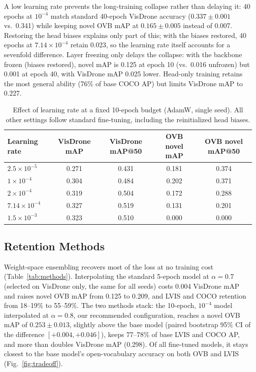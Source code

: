 \documentclass[conf]{new-aiaa}
\begin{document}
A low learning rate prevents the long-training collapse rather than delaying it: 40 epochs at
$10^{-4}$ match standard 40-epoch VisDrone accuracy ($0.337 \pm 0.001$ vs.\ 0.341) while keeping
novel OVB mAP at $0.165 \pm 0.005$ instead of 0.007. Restoring the head biases explains only
part of this; with the biases restored, 40 epochs at $7.14\times10^{-4}$ retain 0.023, so the
learning rate itself accounts for a sevenfold difference. Layer freezing only delays the
collapse: with the backbone frozen (biases restored), novel mAP is 0.125 at epoch 10 (vs.\
0.016 unfrozen) but 0.001 at epoch 40, with VisDrone mAP 0.025 lower. Head-only training
retains the most general ability (76\% of base COCO AP) but limits VisDrone mAP to 0.227.

\begin{table}[hbt!]
\caption{Effect of learning rate at a fixed 10-epoch budget (AdamW, single seed). All
         other settings follow standard fine-tuning, including the reinitialized head biases.}
\label{tab:lrgrid}
\centering
\begin{tabular}{lcccc}
\hline
\textbf{Learning rate} & \textbf{VisDrone mAP} & \textbf{VisDrone mAP@50} & \textbf{OVB novel mAP} & \textbf{OVB novel mAP@50} \\
\hline
$2.5\times10^{-5}$ & 0.271 & 0.431 & 0.181 & 0.374 \\
$1\times10^{-4}$   & 0.304 & 0.484 & 0.202 & 0.371 \\
$2\times10^{-4}$   & 0.319 & 0.504 & 0.172 & 0.288 \\
$7.14\times10^{-4}$ & 0.327 & 0.519 & 0.131 & 0.201 \\
$1.5\times10^{-3}$ & 0.323 & 0.510 & 0.000 & 0.000 \\
\hline
\end{tabular}
\end{table}

\subsection{Retention Methods}

Weight-space ensembling recovers most of the loss at no training cost
(Table~\ref{tab:methods}). Interpolating the standard 5-epoch model at $\alpha = 0.7$
(selected on VisDrone only, the same for all seeds) costs 0.004 VisDrone mAP and raises novel
OVB mAP from 0.125 to 0.209, and LVIS and COCO retention from 18--19\% to 55--59\%. The two
methods stack: the 10-epoch, $10^{-4}$ model interpolated at $\alpha = 0.8$, our recommended
configuration, reaches a novel OVB mAP of $0.253 \pm 0.013$, slightly above the base model
(paired bootstrap 95\% CI of the difference $[+0.004, +0.046]$), keeps 77--78\% of base LVIS
and COCO AP, and more than doubles VisDrone mAP (0.298). Of all fine-tuned models, it stays
closest to the base model's open-vocabulary accuracy on both OVB and LVIS
(Fig.~\ref{fig:tradeoff}).
\end{document}
